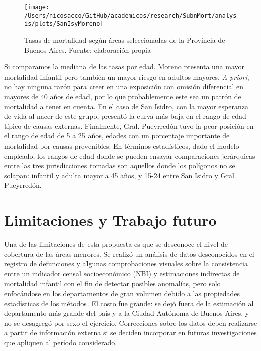 \documentclass[12pt,spanish,]{article}
\begin{document}
\begin{figure}

{\centering \texttt{[image: /Users/nicosacco/GitHub/academicos/research/SubnMort/analysis/plots/SanIsyMoreno]} 

}

\caption{Tasas de mortalidad según áreas seleccionadas de la Provincia de Buenos Aires. Fuente: elaboración propia}\label{fig:dptosBsAs}
\end{figure}

Si comparamos la mediana de las tasas por edad, Moreno presenta una
mayor mortalidad infantil pero también un mayor riesgo en adultos
mayores. \emph{A priori}, no hay ninguna razón para creer en una
exposición con omisión diferencial en mayores de 40 años de edad, por lo
que probablemente este sea un patrón de mortalidad a tener en cuenta. En
el caso de San Isidro, con la mayor esperanza de vida al nacer de este
grupo, presentó la curva más baja en el rango de edad típico de causas
externas. Finalmente, Gral. Pueyrredón tuvo la peor posición en el rango
de edad de 5 a 25 años, edades con un porcentaje importante de
mortalidad por causas prevenibles. En términos estadísticos, dado el
modelo empleado, los rangos de edad donde se pueden ensayar
comparaciones jerárquicas entre las tres jurisdicciones tomadas son
aquellos donde los polígonos no se solapan: infantil y adulta mayor a 45
años, y 15-24 entre San Isidro y Gral. Pueyrredón.

\hypertarget{limitaciones-y-trabajo-futuro}{%
\section{Limitaciones y Trabajo
futuro}\label{limitaciones-y-trabajo-futuro}}

Una de las limitaciones de esta propuesta es que se desconoce el nivel
de cobertura de las áreas menores. Se realizó un análisis de datos
desconocidos en el registro de defunciones y algunas comprobaciones
visuales sobre la consistencia entre un indicador censal socioeconómico
(NBI) y estimaciones indirectas de mortalidad infantil con el fin de
detectar posibles anomalías, pero solo enfocándose en los departamentos
de gran volumen debido a las propiedades estadísticas de los métodos. El
costo fue grande: se dejó fuera de la estimación al departamento más
grande del país y a la Ciudad Autónoma de Buenos Aires, y no se
desagregó por sexo el ejercicio. Correcciones sobre los datos deben
realizarse a partir de información externa si se deciden incorporar en
futuras investigaciones que apliquen al período considerado.
\end{document}
